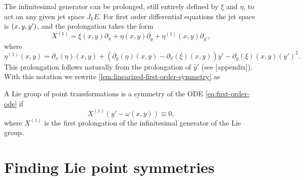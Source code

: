 The infinitesimal generator can be prolonged, still entirely defined by \(\xi\) and \(\eta\), to act on any given jet space \(J_k E\).
For first order differential equations the jet space is \(\pqty{x, y, y'}\), and the prolongation takes the form
\begin{equation}
  X^{(1)} = \xi(x,y) \partial_x + \eta(x,y) \partial_y + \eta^{(1)}(x,y) \partial_{y'},
\end{equation}
where
\begin{equation}
  \eta^{(1)}(x,y) =
  \partial_x(\eta)(x,y) + (\partial_y(\eta)(x,y) - \partial_x(\xi)(x,y)) y' - \partial_y(\xi)(x,y) \left(y'\right)^2.
\end{equation}
This prolongation follows naturally from the prolongation of \(\hat{y}'\) (see [appendix]). %
With this notation we rewrite \cref{lem:linearized-first-order-symmetry} as
\begin{thm} \label{thm:linearized-first-order-symmetry}
  A Lie group of point transformations is a symmetry of the ODE \ref{eq:first-order-ode} if
  \begin{equation} \label{eq:linearized-first-order-symmetry}
    X^{(1)}\left(y' - \omega(x,y)\right) \equiv 0,
  \end{equation}
  where \(X^{(1)}\) is the first prolongation of the infinitesimal generator of the Lie group.
\end{thm} %

\section{Finding Lie point symmetries}

